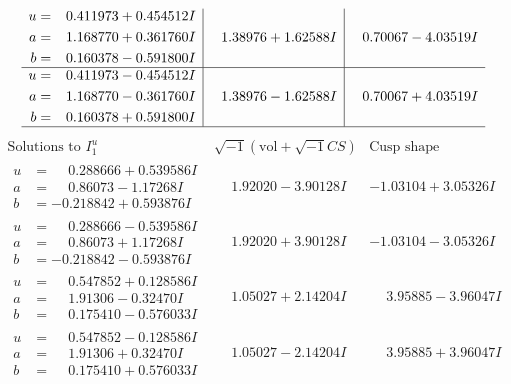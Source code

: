 \documentclass[1p]{elsarticle_modified}
\theoremstyle{definition}
\newcommand{\I}{\sqrt{-1}}
\begin{document}
$$\begin{array}{c|c|c}
\begin{aligned}
u &= \phantom{-}0.411973 + 0.454512 I \\
a &= \phantom{-}1.168770 + 0.361760 I \\
b &= \phantom{-}0.160378 - 0.591800 I\end{aligned}
 & \phantom{-}1.38976 + 1.62588 I & \phantom{-}0.70067 - 4.03519 I \\ \hline\begin{aligned}
u &= \phantom{-}0.411973 - 0.454512 I \\
a &= \phantom{-}1.168770 - 0.361760 I \\
b &= \phantom{-}0.160378 + 0.591800 I\end{aligned}
 & \phantom{-}1.38976 - 1.62588 I & \phantom{-}0.70067 + 4.03519 I\\
 \hline 
 \end{array}$$\newpage$$\begin{array}{c|c|c}  
\text{Solutions to }I^u_{1}& \I (\text{vol} + \sqrt{-1}CS) & \text{Cusp shape}\\
 \hline 
\begin{aligned}
u &= \phantom{-}0.288666 + 0.539586 I \\
a &= \phantom{-}0.86073 - 1.17268 I \\
b &= -0.218842 + 0.593876 I\end{aligned}
 & \phantom{-}1.92020 - 3.90128 I & -1.03104 + 3.05326 I \\ \hline\begin{aligned}
u &= \phantom{-}0.288666 - 0.539586 I \\
a &= \phantom{-}0.86073 + 1.17268 I \\
b &= -0.218842 - 0.593876 I\end{aligned}
 & \phantom{-}1.92020 + 3.90128 I & -1.03104 - 3.05326 I \\ \hline\begin{aligned}
u &= \phantom{-}0.547852 + 0.128586 I \\
a &= \phantom{-}1.91306 - 0.32470 I \\
b &= \phantom{-}0.175410 - 0.576033 I\end{aligned}
 & \phantom{-}1.05027 + 2.14204 I & \phantom{-}3.95885 - 3.96047 I \\ \hline\begin{aligned}
u &= \phantom{-}0.547852 - 0.128586 I \\
a &= \phantom{-}1.91306 + 0.32470 I \\
b &= \phantom{-}0.175410 + 0.576033 I\end{aligned}
 & \phantom{-}1.05027 - 2.14204 I & \phantom{-}3.95885 + 3.96047 I \\ \hline\begin{aligned}

\end{aligned}
\end{array}$$
\end{document}
